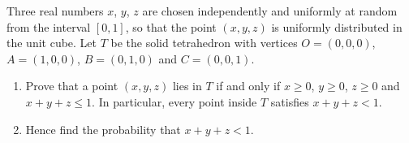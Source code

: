 Three real numbers $x$, $y$, $z$ are chosen independently and uniformly at random from the interval $[0,1]$, so that the point $(x,y,z)$ is uniformly distributed in the unit cube. Let $T$ be the solid tetrahedron with vertices $O=(0,0,0)$, $A=(1,0,0)$, $B=(0,1,0)$ and $C=(0,0,1)$.
\begin{enumerate}
\item[(a)] Prove that a point $(x,y,z)$ lies in $T$ if and only if $x\ge0$, $y\ge0$, $z\ge0$ and $x+y+z\le1$. In particular, every point inside $T$ satisfies $x+y+z<1$.
\item[(b)] Hence find the probability that $x+y+z<1$.
\end{enumerate}

